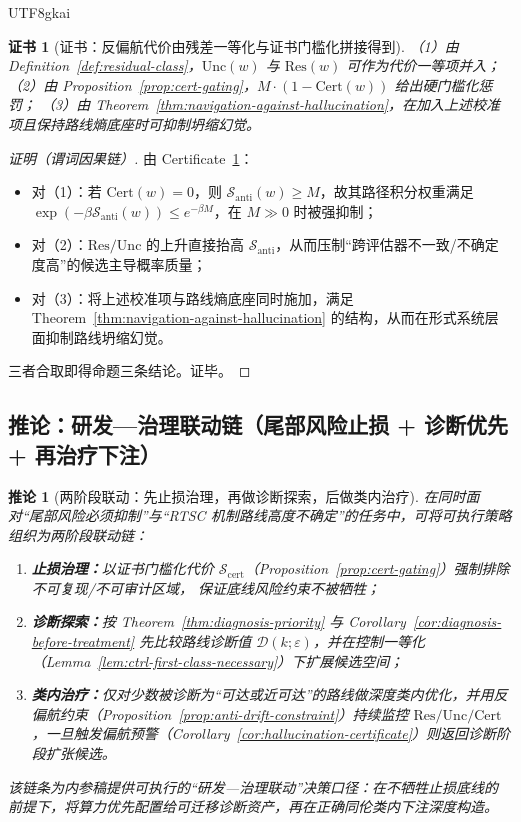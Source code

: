 \documentclass[12pt]{article}
\newtheorem{corollary}{推论}[section]
\newtheorem{certificate}{证书}[section]
\newcommand{\RTSC}{\textsf{RTSC}}
\begin{document}
\begin{CJK*}{UTF8}{gkai}
\begin{certificate}[证书：反偏航代价由残差一等化与证书门槛化拼接得到]
\label{cert:anti-drift-constraint}
（1）由 Definition~\ref{def:residual-class}，$\mathrm{Unc}(w)$ 与 $\mathrm{Res}(w)$ 可作为代价一等项并入；
（2）由 Proposition~\ref{prop:cert-gating}，$M\cdot(1-\mathrm{Cert}(w))$ 给出硬门槛化惩罚；
（3）由 Theorem~\ref{thm:navigation-against-hallucination}，在加入上述校准项且保持路线熵底座时可抑制坍缩幻觉。
\end{certificate}

\begin{proof}[证明（谓词因果链）]
由 Certificate~\ref{cert:anti-drift-constraint}：
\begin{itemize}
  \item 对（1）：若 $\mathrm{Cert}(w)=0$，则 $\mathcal{S}_{\mathrm{anti}}(w)\ge M$，故其路径积分权重满足 $\exp(-\beta \mathcal{S}
    _{\mathrm{anti}}(w))\le e^{-\beta M}$，在 $M\gg 0$ 时被强抑制；
  \item 对（2）：$\mathrm{Res}/\mathrm{Unc}$ 的上升直接抬高 $\mathcal{S}_{\mathrm{anti}}$，从而压制“跨评估器不一致/不确定度高”的候选主导概率质量；
  \item 对（3）：将上述校准项与路线熵底座同时施加，满足 Theorem~\ref{thm:navigation-against-hallucination} 的结构，从而在形式系统层面抑制路线坍缩幻觉。
\end{itemize}
三者合取即得命题三条结论。证毕。
\end{proof}

\subsection{推论：研发—治理联动链（尾部风险止损 + 诊断优先 + 再治疗下注）}

\begin{corollary}[两阶段联动：先止损治理，再做诊断探索，后做类内治疗]
\label{cor:tail-risk-rd-chain}
在同时面对“尾部风险必须抑制”与“\RTSC{} 机制路线高度不确定”的任务中，可将可执行策略组织为两阶段联动链：
\begin{enumerate}
  \item \textbf{止损治理：}以证书门槛化代价 $\mathcal{S}_{\mathrm{cert}}$（Proposition~\ref{prop:cert-gating}）强制排除不可复现/不可审计区域，
    保证底线风险约束不被牺牲；
  \item \textbf{诊断探索：}按 Theorem~\ref{thm:diagnosis-priority} 与 Corollary~\ref{cor:diagnosis-before-treatment} 先比较路线诊断值
    $\mathcal{D}(k;\varepsilon)$，并在控制一等化（Lemma~\ref{lem:ctrl-first-class-necessary}）下扩展候选空间；
  \item \textbf{类内治疗：}仅对少数被诊断为“可达或近可达”的路线做深度类内优化，并用反偏航约束（Proposition~\ref{prop:anti-drift-constraint}）持续监控 $\mathrm{Res}
    /\mathrm{Unc}/\mathrm{Cert}$，一旦触发偏航预警（Corollary~\ref{cor:hallucination-certificate}）则返回诊断阶段扩张候选。
\end{enumerate}
该链条为内参稿提供可执行的“研发—治理联动”决策口径：在不牺牲止损底线的前提下，将算力优先配置给可迁移诊断资产，再在正确同伦类内下注深度构造。
\end{corollary}


\end{CJK*}
\end{document}
